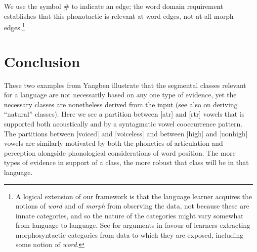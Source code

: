 We use the symbol \# to indicate an edge; the word domain requirement establishes that this phonotactic is relevant at  word edges, not at all morph edges.\footnote{A logical extension of our framework is that the language learner acquires the notions of \textit{word} and of \textit{morph} from observing the data, not because these are innate categories, and so the nature of the categories might vary somewhat from language to language. See \citet{Haspelmath:2007, Haspelmath:2011} for arguments in favour of learners extracting morphosyntactic categories from data to which they are exposed, including some notion of \textit{word}.}

\section{Conclusion} 
These two examples from Yangben illustrate that the segmental classes relevant for a language are not necessarily based on any one type of evidence, yet the necessary classes are nonetheless derived from the input (see also \citealt{Flemming:2005, Sylak-Glassman:2014} on deriving ``natural'' classes). Here we see a partition between [atr] and [rtr] vowels that is supported both acoustically and by a syntagmatic vowel cooccurrence pattern. The partitions between [voiced] and [voiceless] and between [high] and [nonhigh] vowels are similarly motivated by both the phonetics of articulation and perception  alongside  phonological considerations of word position. The more types of evidence in support of a class, the more robust that class will be in that language.

